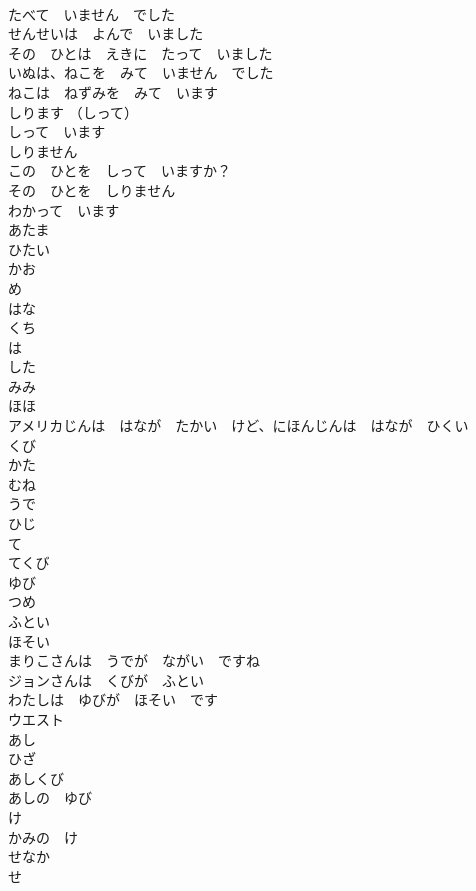 \documentclass[8pt]{extreport}
\begin{document}
\begin{CJK}{UTF8}{min}
\\	たべて　いません　でした	
\\	せんせいは　よんで　いました	
\\	その　ひとは　えきに　たって　いました	
\\	いぬは、ねこを　みて　いません　でした	
\\	ねこは　ねずみを　みて　います	
\\	しります （しって）	
\\	しって　います	
\\	しりません	
\\	この　ひとを　しって　いますか？	
\\	その　ひとを　しりません	
\\	わかって　います	
\\	あたま	
\\	ひたい	
\\	かお	
\\	め	
\\	はな 
\\	くち	
\\	は	
\\	した 
\\	みみ	
\\	ほほ	
\\	アメリカじんは　はなが　たかい　けど、にほんじんは　はなが　ひくい	
\\	くび	
\\	かた	
\\	むね	
\\	うで	
\\	ひじ	
\\	て	
\\	てくび	
\\	ゆび	
\\	つめ	
\\	ふとい	
\\	ほそい	
\\	まりこさんは　うでが　ながい　ですね	
\\	ジョンさんは　くびが　ふとい	
\\	わたしは　ゆびが　ほそい　です	
\\	ウエスト	
\\	あし	
\\	ひざ	
\\	あしくび	
\\	あしの　ゆび	
\\	け	
\\	かみの　け	
\\	せなか	
\\	せ	

\end{CJK}
\end{document}
